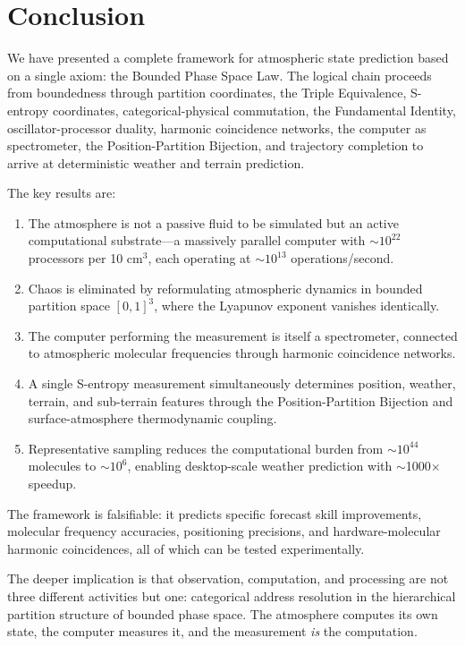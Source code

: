\documentclass[twocolumn,10pt]{article}
\theoremstyle{definition}
\begin{document}
\section{Conclusion}\label{sec:conclusion}

We have presented a complete framework for atmospheric state prediction based on a single axiom: the Bounded Phase Space Law. The logical chain proceeds from boundedness through partition coordinates, the Triple Equivalence, S-entropy coordinates, categorical-physical commutation, the Fundamental Identity, oscillator-processor duality, harmonic coincidence networks, the computer as spectrometer, the Position-Partition Bijection, and trajectory completion to arrive at deterministic weather and terrain prediction.

The key results are:
\begin{enumerate}[nosep]
    \item The atmosphere is not a passive fluid to be simulated but an active computational substrate---a massively parallel computer with $\sim 10^{22}$ processors per 10 cm$^3$, each operating at $\sim 10^{13}$ operations/second.

    \item Chaos is eliminated by reformulating atmospheric dynamics in bounded partition space $[0,1]^3$, where the Lyapunov exponent vanishes identically.

    \item The computer performing the measurement is itself a spectrometer, connected to atmospheric molecular frequencies through harmonic coincidence networks.

    \item A single S-entropy measurement simultaneously determines position, weather, terrain, and sub-terrain features through the Position-Partition Bijection and surface-atmosphere thermodynamic coupling.

    \item Representative sampling reduces the computational burden from $\sim 10^{44}$ molecules to $\sim 10^6$, enabling desktop-scale weather prediction with $\sim$1000$\times$ speedup.
\end{enumerate}

The framework is falsifiable: it predicts specific forecast skill improvements, molecular frequency accuracies, positioning precisions, and hardware-molecular harmonic coincidences, all of which can be tested experimentally.

The deeper implication is that observation, computation, and processing are not three different activities but one: categorical address resolution in the hierarchical partition structure of bounded phase space. The atmosphere computes its own state, the computer measures it, and the measurement \emph{is} the computation.



\end{document}
